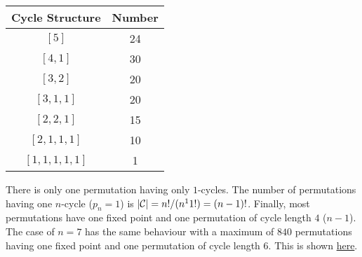 \begin{tabular}{cc}
    Cycle Structure & Number \\ \hline
    $[5]$ &  24 \\
    $[4, 1]$ & 30 \\
    $[3, 2]$ & 20 \\
    $[3, 1, 1]$ & 20 \\
    $[2, 2, 1]$ & 15 \\
    $[2, 1, 1, 1]$ & 10 \\
    $[1, 1, 1, 1, 1]$ & 1
\end{tabular}

\vspace{2mm}

There is only one permutation having only $1$-cycles. The number of permutations having one $n$-cycle ($p_n=1$) is $|\mathcal{C}| = n!/(n^1 1!) = (n-1)!$. Finally, most permutations have one fixed point and one permutation of cycle length $4$ ($n-1$). The case of $n=7$ has the same behaviour with a maximum of $840$ permutations having one fixed point and one permutation of cycle length $6$. This is shown \href{https://math.ucr.edu/home/baez/permutations/permutations_1.html}{here}.

